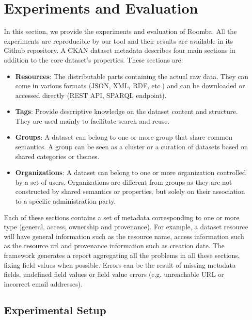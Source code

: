\section{Experiments and Evaluation}
\label{section:roomba_experiment}
In this section, we provide the experiments and evaluation of Roomba. All the experiments are reproducible by our tool and their results are available in its Github repository. A CKAN dataset metadata describes four main sections in addition to the core dataset's properties. These sections are:
\begin{itemize}
  \item \textbf{Resources}: The distributable parts containing the actual raw data. They can come in various formats (JSON, XML, RDF, etc.) and can be downloaded or accessed directly (REST API, SPARQL endpoint).
  \item \textbf{Tags}: Provide descriptive knowledge on the dataset content and structure. They are used mainly to facilitate search and reuse.
  \item \textbf{Groups}: A dataset can belong to one or more group that share common semantics. A group can be seen as a cluster or a curation of datasets based on shared categories or themes.
  \item \textbf{Organizations}: A dataset can belong to one or more organization controlled by a set of users. Organizations are different from groups as they are not constructed by shared semantics or properties, but solely on their association to a specific administration party.
\end{itemize}

Each of these sections contains a set of metadata corresponding to one or more type (general, access, ownership and provenance). For example, a dataset resource will have general information such as the resource name, access information such as the resource url and provenance information such as creation date. The framework generates a report aggregating all the problems in all these sections, fixing field values when possible. Errors can be the result of missing metadata fields, undefined field values or field value errors (e.g. unreachable URL or incorrect email addresses).

\subsection{Experimental Setup}

